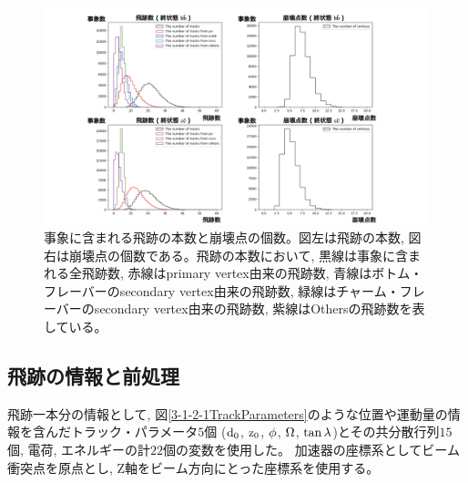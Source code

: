 \begin{figure}[htbp]
 \centering
 \includegraphics[trim = 150 0 150 0, width=1.0\textwidth, clip]{Figure/3Networks/3-1-1-2TracksandVertices.png}
 \caption[事象に含まれる飛跡の本数と崩壊点の個数]{事象に含まれる飛跡の本数と崩壊点の個数。図左は飛跡の本数, 図右は崩壊点の個数である。飛跡の本数において, 黒線は事象に含まれる全飛跡数, 赤線はprimary vertex由来の飛跡数, 青線はボトム・フレーバーのsecondary vertex由来の飛跡数, 緑線はチャーム・フレーバーのsecondary vertex由来の飛跡数, 紫線はOthersの飛跡数を表している。}
 \label{3-1-1-2TracksandVertices}
\end{figure}


\subsection{飛跡の情報と前処理} \label{Net:Data:TrackInformationandPreprocessing}

飛跡一本分の情報として, 図\ref{3-1-2-1TrackParameters}のような位置や運動量の情報を含んだトラック・パラメータ$5$個 ($\rm d_0$, $\rm z_0$, $\rm \phi$, $\rm \Omega$, $\rm \tan{\lambda}$)\cite{TrackParametersLCIO}とその共分散行列$15$個, 電荷, エネルギーの計$22$個の変数を使用した。
加速器の座標系としてビーム衝突点を原点とし, Z軸をビーム方向にとった座標系を使用する。

